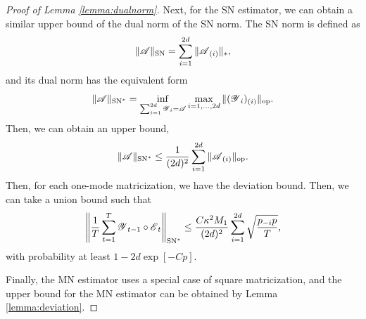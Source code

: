 \documentclass[12pt]{article}
\newcommand{\cm}[1]{\mbox{\boldmath$\mathscr{#1}$}}
\begin{document}
\begin{proof}[Proof of Lemma \ref{lemma:dualnorm}]
	Next, for the SN estimator, we can obtain a similar upper bound of the dual norm of the SN norm. The SN norm is defined as
	\begin{equation}
	\|\cm{A}\|_{\text{SN}}=\sum_{i=1}^{2d}\|\cm{A}_{(i)}\|_*,
	\end{equation}
	and its dual norm has the equivalent form
	\begin{equation}
	\|\cm{A}\|_{\text{SN}^*}=\inf_{\sum_{i=1}^{2d}\scalebox{0.7}{\cm{Y}}_i=\scalebox{0.7}{\cm{A}}}\max_{i=1,\dots,2d}\|(\cm{Y}_i)_{(i)}\|_{\text{op}}.
	\end{equation}
	Then, we can obtain an upper bound,
	\begin{equation}
	\|\cm{A}\|_{\text{SN}^*}\leq\frac{1}{(2d)^2}\sum_{i=1}^{2d}\|\cm{A}_{(i)}\|_{\text{op}}.
	\end{equation}
	Then, for each one-mode matricization, we have the deviation bound. Then, we can take a union bound such that
	\begin{equation}
	\left\|\frac{1}{T}\sum_{t=1}^T\cm{Y}_{t-1}\circ\cm{E}_t\right\|_{\text{SN}^*}\leq \frac{C\kappa^2 M_1}{(2d)^2}\sum_{i=1}^{2d}\sqrt{\frac{p_{-i}p}{T}},
	\end{equation}
	with probability at least $1-2d\exp[-Cp]$.
	
	Finally, the MN estimator uses a special case of square matricization, and the upper bound for the MN estimator can be obtained by Lemma \ref{lemma:deviation}.
\end{proof}
\end{document}
